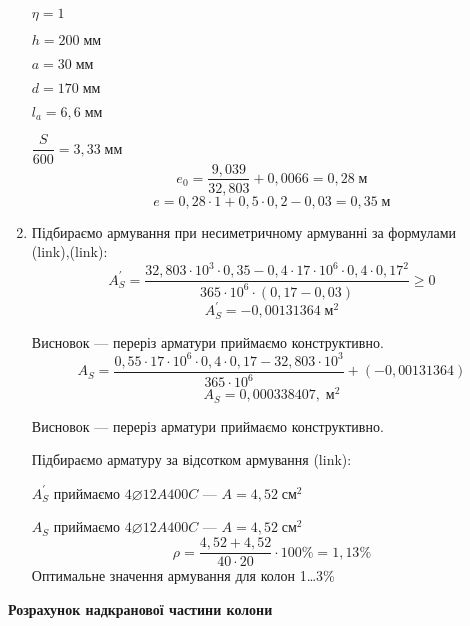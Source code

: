 \documentclass[a4paper,14pt]{article}
\begin{document}
\begin{enumerate}
        $\eta = 1$

        $h = 200\;\textit{мм}$

        $a = 30\;\textit{мм}$

        $d = 170\;\textit{мм}$

        $l_a = 6,6\;\textit{мм}$

        $\dfrac{S}{600} = 3,33\;\textit{мм}$
        $$e_0 = \dfrac{9,039}{32,803} + 0,0066 = 0,28\;\textit{м}$$
        $$e = 0,28 \cdot 1 +  0,5 \cdot 0,2 - 0,03 = 0,35\;\textit{м}$$
    \item Підбираємо армування при несиметричному армуванні за формулами\\(link),(link):
        $$A_S^\prime = \dfrac{32,803 \cdot 10^3 \cdot 0,35 - 0,4 \cdot 17 \cdot 10^6 \cdot 0,4 \cdot 0,17^2}{365 \cdot 10^6 \cdot (0,17 - 0,03)} \geqslant 0$$
        $$A_S^\prime = -0,00131364\;\textit{м}^2$$

        Висновок --- переріз арматури приймаємо конструктивно.
        $$A_S = \dfrac{0,55 \cdot 17 \cdot 10^6 \cdot 0,4 \cdot 0,17 - 32,803 \cdot 10^3}{365 \cdot 10^6} +(-0,00131364)$$
        $$A_S = 0,000338407,\;\textit{м}^2$$

        Висновок --- переріз арматури приймаємо конструктивно.

        Підбираємо арматуру за відсотком армування (link):

        $A_S^\prime$ приймаємо $4\varnothing12A400C$ --- $A = 4,52\;\textit{см}^2$

        $A_S$ приймаємо $4\varnothing12A400C$ --- $A = 4,52\;\textit{см}^2$
        $$\rho = \dfrac{4,52 + 4,52}{40 \cdot 20} \cdot 100\% = 1,13\%$$
        Оптимальне значення армування для колон 1\ldots 3\%
\end{enumerate}
\textbf{Розрахунок надкранової частини колони} %
\end{document}
